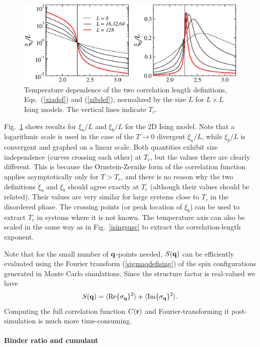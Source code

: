 \documentclass[draft,numberedheadings]{aipproc}
\begin{document}
\begin{figure}
\includegraphics[width=12.5cm, clip]{xi2d.eps}
\caption{Temperature dependence of the two correlation length definitions, Eqs.~(\ref{xiadef}) and (\ref{xibdef}), normalized by the size $L$ 
for $L\times L$ Ising models. The vertical lines indicate $T_c$.}
\label{isingxi2d}
\end{figure}

Fig.~\ref{isingxi2d} shows results for $\xi_a/L$ and $\xi_b/L$ for the 2D Ising model. Note that a logarithmic scale is used in the case of the 
$T\to 0$ divergent $\xi_a/L$, while $\xi_b/L$ is convergent and graphed on a linear scale. Both quantities exhibit size independence (curves crossing 
each other) at $T_c$, but the values there are clearly different. This is because the Ornstein-Zernike form of the correlation function applies 
asymptotically only for $T>T_c$, and there is no reason why the two definitions $\xi_a$ and $\xi_b$  should agree exactly at $T_c$ (although their
values should be related). Their values are very similar for large systems close to $T_c$ in the disordered phase. The crossing points (or peak location 
of $\xi_b$) can be used to extract $T_c$ in systems where it is not known. The temperature axis can also be scaled in the same way as in Fig.~\ref{isingsusc} 
to extract the correlation-length exponent.

Note that for the small number of ${\bf q}$-points needed,  $S({\bf q})$ can be efficiently evaluated using the Fourier transform 
(\ref{sigmaqdefising}) of the spin configurations generated in Monte Carlo simulations. Since the structure factor is real-valued we have
\begin{equation}
S({\bf q}) = \langle {\rm Re}\{\sigma_{\bf q}\}^2\rangle + \langle {\rm Im}\{\sigma_{\bf q}\}^2\rangle.
\label{sqimre}
\end{equation}
Computing the full correlation function $C({\bf r})$ and Fourier-transforming it post-simulation is much more time-consuming.

\paragraph{Binder ratio and cumulant}
\end{document}
